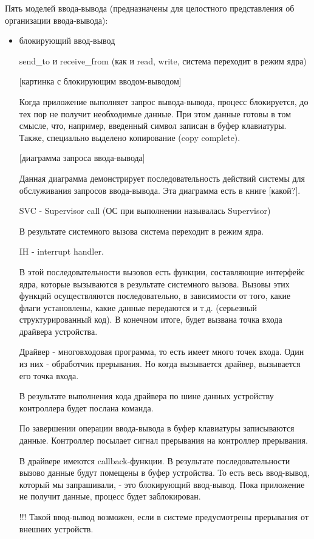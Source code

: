 \documentclass[14pt, a4paper]{article}
\begin{document}
	Пять моделей ввода-вывода (предназначены для целостного представления об организации ввода-вывода):
	\begin{itemize}
		\item блокирующий ввод-вывод
		
		send\_to и receive\_from (как и read, write, система переходит в режим ядра)
		
		[картинка с блокирующим вводом-выводом]
		
		Когда приложение выполняет запрос вывода-вывода, процесс блокируется, до тех пор не получит необходимые данные. При этом данные готовы в том смысле, что, например, введенный символ записан в буфер клавиатуры. Также, специально выделено копирование (copy complete).
		
		[диаграмма запроса ввода-вывода]
		
		Данная диаграмма демонстрирует последовательность действий системы для обслуживания запросов ввода-вывода. Эта диаграмма есть в книге [какой?].
		
		SVC - Supervisor call (ОС при выполнении называлась Supervisor)
		
		В результате системного вызова система переходит в режим ядра.
		
		IH - interrupt handler.
		
		В этой последовательности вызовов есть функции, составляющие интерфейс ядра, которые вызываются в результате системного вызова. Вызовы этих функций осуществляются последовательно, в зависимости от того, какие флаги установлены, какие данные передаются и т.д. (серьезный структурированный код). В конечном итоге, будет вызвана точка входа драйвера устройства.
		
		Драйвер - многовходовая программа, то есть имеет много точек входа. Один из них - обработчик прерывания. Но когда вызывается драйвер, вызывается его точка входа.
		
		В результате выполнения кода драйвера по шине данных устройству контроллера будет послана команда.
		
		По завершении операции ввода-вывода в буфер клавиатуры записываются данные. Контроллер посылает сигнал прерывания на контроллер прерывания.
		
		В драйвере имеются callback-функции. В результате последовательности вызово данные будут помещены в буфер устройства. То есть весь ввод-вывод, который мы запрашивали, - это блокирующий ввод-вывод. Пока приложение не получит данные, процесс будет заблокирован.
		
		!!! Такой ввод-вывод возможен, если в системе предусмотрены прерывания от внешних устройств.
		

\end{itemize}
\end{document}

